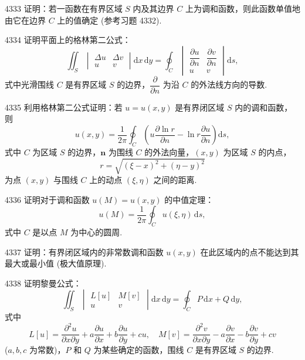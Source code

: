 \begin{prob}[M]{4333}
证明：若一函数在有界区域 $S$ 内及其边界 $C$ 上为调和函数，则此函数单值地由它在边界 $C$ 上的值确定 (参考习题 4332).
\end{prob}

\begin{prob}[M]{4334}
证明平面上的格林第二公式：
\[
\iint_S \begin{vmatrix} \Delta u & \Delta v \\ u & v \end{vmatrix} \mathrm{d}x\,\mathrm{d}y = \oint_C \begin{vmatrix} \dfrac{\partial u}{\partial n} & \dfrac{\partial v}{\partial n} \\ u & v \end{vmatrix} \mathrm{d}s,
\]
式中光滑围线 $C$ 是有界区域 $S$ 的边界，$\dfrac{\partial}{\partial n}$ 为沿 $C$ 的外法线方向的导数.
\end{prob}

\begin{prob}[M]{4335}
利用格林第二公式证明：若 $u = u(x,y)$ 是有界闭区域 $S$ 内的调和函数，则
\[
u(x,y) = \frac{1}{2\pi} \oint_C \left( u \frac{\partial \ln r}{\partial n} - \ln r \frac{\partial u}{\partial n} \right) \mathrm{d}s,
\]
式中 $C$ 为区域 $S$ 的边界，$\boldsymbol{n}$ 为围线 $C$ 的外法向量，$(x,y)$ 为区域 $S$ 的内点，
\[
r = \sqrt{(\xi - x)^2 + (\eta - y)^2}
\]
为点 $(x,y)$ 与围线 $C$ 上的动点 $(\xi, \eta)$ 之间的距离.
\end{prob}

\begin{prob}[M]{4336}
证明对于调和函数 $u(M) = u(x,y)$ 的中值定理：
\[
u(M) = \frac{1}{2\pi} \oint_C u(\xi, \eta)\,\mathrm{d}s,
\]
式中 $C$ 是以点 $M$ 为中心的圆周.
\end{prob}

\begin{prob}[M]{4337}
证明：有界闭区域内的非常数调和函数 $u(x,y)$ 在此区域内的点不能达到其最大或最小值 (极大值原理).
\end{prob}

\begin{prob}[M]{4338}
证明黎曼公式：
\[
\iint_S \begin{vmatrix} L[u] & M[v] \\ u & v \end{vmatrix} \mathrm{d}x\,\mathrm{d}y = \oint_C P\,\mathrm{d}x + Q\,\mathrm{d}y,
\]
式中
\[
L[u] = \frac{\partial^2 u}{\partial x \partial y} + a \frac{\partial u}{\partial x} + b \frac{\partial u}{\partial y} + cu, \quad M[v] = \frac{\partial^2 v}{\partial x \partial y} - a \frac{\partial v}{\partial x} - b \frac{\partial v}{\partial y} + cv
\]
($a, b, c$ 为常数)，$P$ 和 $Q$ 为某些确定的函数，围线 $C$ 是有界区域 $S$ 的边界.
\end{prob}

